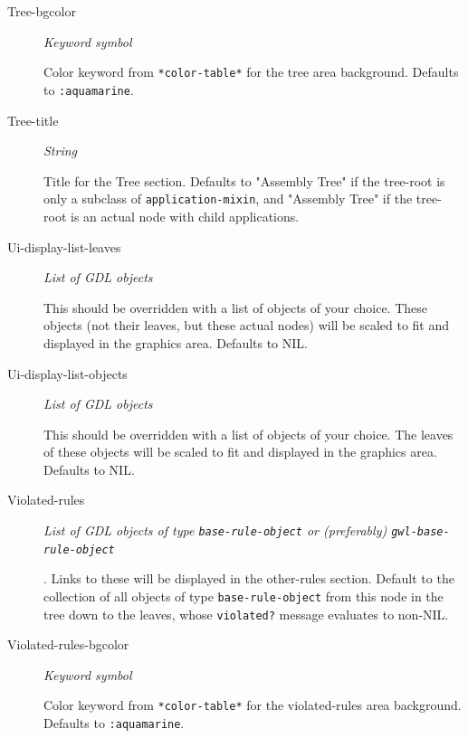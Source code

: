 \documentclass [11pt]{book}
\begin{document}
\begin{itemize}
\begin{description}
\item [Tree-bgcolor]
\emph{Keyword symbol}

 Color keyword from \texttt{*color-table*} for the tree area background. Defaults to \texttt{:aquamarine}.




\item [Tree-title]
\emph{String}

 Title for the Tree section. Defaults to "Assembly Tree" if the tree-root is only a
subclass of \texttt{application-mixin}, and "Assembly Tree" if the tree-root is an actual node with
child applications.




\item [Ui-display-list-leaves]
\emph{List of GDL objects}

 This should be overridden with a list of objects of your choice. These objects (not their leaves,
but these actual nodes) will be scaled to fit and displayed in the graphics area. Defaults to NIL.




\item [Ui-display-list-objects]
\emph{List of GDL objects}

 This should be overridden with a list of objects of your choice. The leaves of these objects will
be scaled to fit and displayed in the graphics area. Defaults to NIL.




\item [Violated-rules]
\emph{List of GDL objects of type \texttt{base-rule-object} or (preferably) \texttt{gwl-base-rule-object}}

.
Links to these will be displayed in the other-rules section. Default to the collection of all objects of type
\texttt{base-rule-object} from this node in the tree down to the leaves, whose \texttt{violated?} message
evaluates to non-NIL.




\item [Violated-rules-bgcolor]
\emph{Keyword symbol}

 Color keyword from \texttt{*color-table*} for the violated-rules area background. Defaults to \texttt{:aquamarine}.





\end{description}
\end{itemize}
\end{document}
